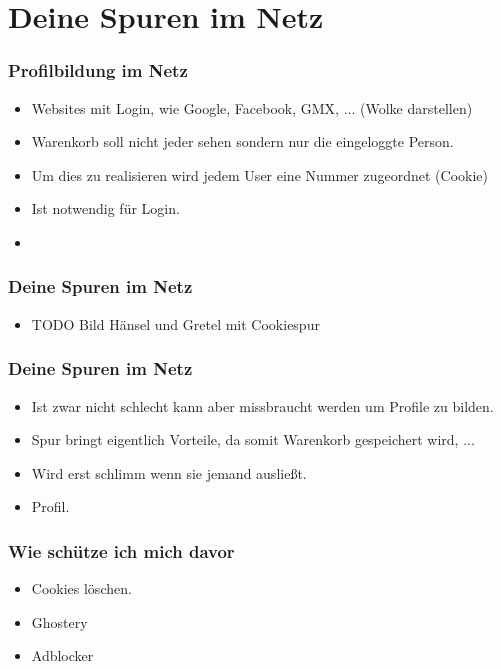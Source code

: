\section{Deine Spuren im Netz}

\begin{frame}
\frametitle{Profilbildung im Netz}

\begin{itemize}
  \item Websites mit Login, wie Google, Facebook, GMX, ... (Wolke darstellen)
  \item Warenkorb soll nicht jeder sehen sondern nur die eingeloggte Person.
  \item Um dies zu realisieren wird jedem User eine Nummer zugeordnet (Cookie)
  \item Ist notwendig für Login.
  \item
\end{itemize}

\end{frame}

\begin{frame}
\frametitle{Deine Spuren im Netz}

\begin{itemize}
  \item TODO Bild Hänsel und Gretel mit Cookiespur
\end{itemize}

\end{frame}


\begin{frame}
  \frametitle{Deine Spuren im Netz}
  \begin{itemize}
    \item Ist zwar nicht schlecht kann aber missbraucht werden um Profile zu bilden.
    \item Spur bringt eigentlich Vorteile, da somit Warenkorb gespeichert wird, ...
    \item Wird erst schlimm wenn sie jemand ausließt.
    \item Profil.
  \end{itemize}
\end{frame}

\begin{frame}
  \frametitle{Wie schütze ich mich davor}
  \begin{itemize}
    \item Cookies löschen.
    \item Ghostery
    \item Adblocker
  \end{itemize}
\end{frame}


